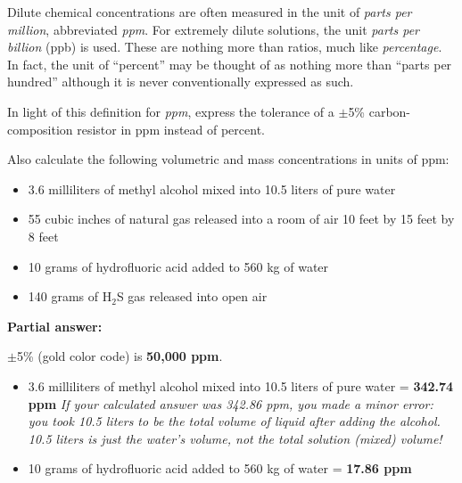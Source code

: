 

Dilute chemical concentrations are often measured in the unit of {\it parts per million}, abbreviated {\it ppm}.  For extremely dilute solutions, the unit {\it parts per billion} (ppb) is used.  These are nothing more than ratios, much like {\it percentage}.  In fact, the unit of ``percent'' may be thought of as nothing more than ``parts per hundred'' although it is never conventionally expressed as such.

\vskip 10pt

In light of this definition for {\it ppm}, express the tolerance of a $\pm$5\% carbon-composition resistor in ppm instead of percent.

\vskip 10pt

Also calculate the following volumetric and mass concentrations in units of ppm:

\begin{itemize}
\item{} 3.6 milliliters of methyl alcohol mixed into 10.5 liters of pure water
\vskip 10pt
\item{} 55 cubic inches of natural gas released into a room of air 10 feet by 15 feet by 8 feet
\vskip 10pt
\item{} 10 grams of hydrofluoric acid added to 560 kg of water
\vskip 10pt
\item{} 140 grams of H$_{2}$S gas released into open air
\end{itemize}

\vskip 10pt







\noindent
{\bf Partial answer:}

\vskip 10pt

$\pm$5\% (gold color code) is {\bf 50,000 ppm}.

\begin{itemize}
\item{} 3.6 milliliters of methyl alcohol mixed into 10.5 liters of pure water = {\bf 342.74 ppm}  {\it If your calculated answer was 342.86 ppm, you made a minor error: you took 10.5 liters to be the total volume of liquid after adding the alcohol.  10.5 liters is just the water's volume, not the total solution (mixed) volume!}
\vskip 10pt
\item{} 10 grams of hydrofluoric acid added to 560 kg of water = {\bf 17.86 ppm}
\vskip 10pt
\end{itemize}

